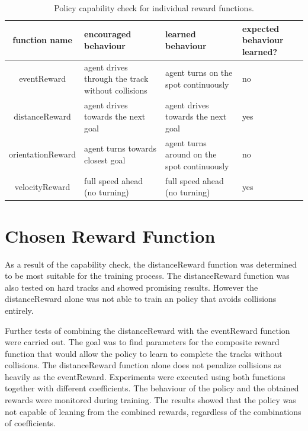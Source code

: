 \begin{table}
    \begin{center}
        \begin{tabular}{|| c | p{} | p{} | p{} ||}
            \hline
            function name     & encouraged behaviour                                & learned behaviour                           & expected behaviour learned? \\ [0.5ex]
            \hline\hline
            eventReward       & agent drives through the track without collisions & agent turns on the spot continuously        & no                          \\
            \hline
            distanceReward    & agent drives towards the next goal                  & agent drives towards the next goal          & yes                         \\
            \hline
            orientationReward & agent turns towards closest goal                    & agent turns around on the spot continuously & no                          \\
            \hline
            velocityReward    & full speed ahead (no turning)                       & full speed ahead (no turning)               & yes                         \\
            \hline
        \end{tabular}
    \end{center}
    \caption{Policy capability check for individual reward functions.}
    \label{table:reward_functions_behaviour}
\end{table}

\section{Chosen Reward Function}

As a result of the capability check, the distanceReward function was determined to be most suitable for the training process. The distanceReward function was also tested on hard tracks and showed promising results. However the distanceReward alone was not able to train an policy that avoids collisions entirely.

Further tests of combining the distanceReward with the eventReward function were carried out. The goal was to find parameters for the composite reward function that would allow the policy to learn to complete the tracks without collisions. The distanceReward function alone does not penalize collisions as heavily as the eventReward.
Experiments were executed using both functions together with different coefficients. The behaviour of the policy and the obtained rewards were monitored during training. The results showed that the policy was not capable of leaning from the combined rewards, regardless of the combinations of coefficients.

